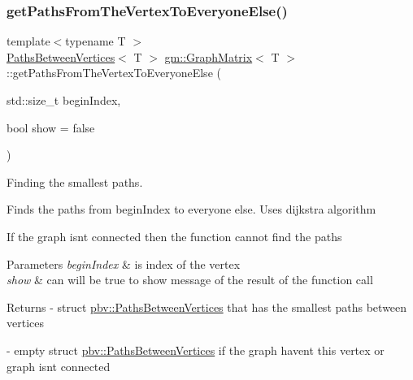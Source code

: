 \subsubsection{\texorpdfstring{get\+Paths\+From\+The\+Vertex\+To\+Everyone\+Else()}{getPathsFromTheVertexToEveryoneElse()}}
{\footnotesize\ttfamily template$<$typename T $>$ \\
\mbox{\hyperlink{structpbv_1_1_paths_between_vertices}{Paths\+Between\+Vertices}}$<$ T $>$ \mbox{\hyperlink{classgm_1_1_graph_matrix}{gm\+::\+Graph\+Matrix}}$<$ T $>$\+::get\+Paths\+From\+The\+Vertex\+To\+Everyone\+Else (\begin{DoxyParamCaption}\item[{std\+::size\+\_\+t}]{begin\+Index,  }\item[{bool}]{show = {\ttfamily false} }\end{DoxyParamCaption})}



Finding the smallest paths. 

Finds the paths from \textquotesingle{}begin\+Index\textquotesingle{} to everyone else. Uses dijkstra algorithm

If the graph isn\textquotesingle{}t connected then the function cannot find the paths


\begin{DoxyParams}{Parameters}
{\em begin\+Index} & is index of the vertex \\
\hline
{\em show} & can will be true to show message of the result of the function call \\
\hline
\end{DoxyParams}
\begin{DoxyReturn}{Returns}
-\/ \textquotesingle{}struct \mbox{\hyperlink{structpbv_1_1_paths_between_vertices}{pbv\+::\+Paths\+Between\+Vertices}}\textquotesingle{} that has the smallest paths between vertices 

-\/ empty \textquotesingle{}struct \mbox{\hyperlink{structpbv_1_1_paths_between_vertices}{pbv\+::\+Paths\+Between\+Vertices}}\textquotesingle{} if the graph haven\textquotesingle{}t this vertex or graph isn\textquotesingle{}t connected 
\end{DoxyReturn}
\mbox{\label{classgm_1_1_graph_matrix_a490a9ef8eb86acc75c42a97cf5dbb368}} 
